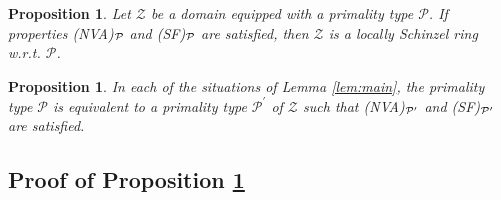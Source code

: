 \documentclass[11pt,a4paper,reqno]{amsart}
\newtheorem{prop}[thm]{Proposition}
\theoremstyle{definition}
\begin{document}
\begin{prop} \label{lem:mainaxiomatic}
Let $\mathcal{Z}$ be a domain equipped with a primality type $\mathcal{P}$. If properties  {\rm (NVA)}$\null_{\mathcal P}$ and {\rm (SF)}$\null_{\mathcal P}$ are satisfied, then ${\mathcal Z}$ is a locally Schinzel ring \hbox{w.r.t.} ${\mathcal P}$. \end{prop}

\begin{prop}\label{lem:schcases}
In each of the situations of Lemma \ref{lem:main}, the primality type $\mathcal{P}$ is equivalent to a primality type $\mathcal{P}^\prime$ of ${\mathcal Z}$ such that {\rm (NVA)}$\null_{{\mathcal P}^\prime}$ and {\rm (SF)}$\null_{{\mathcal P}^\prime}$ are satisfied. 
\end{prop}

\subsection{Proof of Proposition \ref{lem:mainaxiomatic}} \label{ssec:prop3.5}
\end{document}
